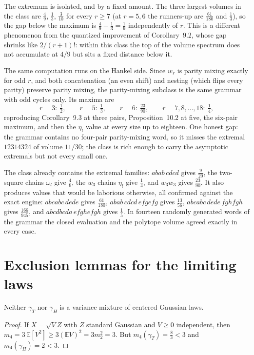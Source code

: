The extremum is isolated, and by a fixed amount.  The three largest
volumes in the class are $\tfrac49$, $\tfrac13$, $\tfrac3{10}$ for every
$r\ge7$ (at $r=5,6$ the runners-up are $\tfrac{61}{180}$ and
$\tfrac13$), so the gap below the maximum is $\tfrac49-\tfrac13=\tfrac19$
independently of $r$.  This is a different phenomenon from the quantized
improvement of Corollary~9.2, whose gap shrinks like $2/(r+1)!$: within
this class the top of the volume spectrum does not accumulate at $4/9$
but sits a fixed distance below it.

The same computation runs on the Hankel side.  Since $w_r$ is parity
mixing exactly for odd $r$, and both concatenation (an even shift) and
nesting (which flips every parity) preserve parity mixing, the
parity-mixing subclass is the same grammar with odd cycles only.  Its
maxima are
\[
r=3:\ \tfrac12,\qquad r=5:\ \tfrac13,\qquad r=6:\ \tfrac{23}{90},\qquad
r=7,8,\dots,18:\ \tfrac14 ,
\]
reproducing Corollary~9.3 at three pairs, Proposition~10.2 at five, the
six-pair maximum, and then the $\eta_l$ value at every size up to
eighteen.  One honest gap: the grammar contains no four-pair
parity-mixing word, so it misses the extremal $12314324$ of volume
$11/30$; the class is rich enough to carry the asymptotic extremals but
not every small one.

The class already contains the extremal families: $abab\,cdcd$ gives
$\tfrac9{20}$, the two-square chains $\omega_l$ give $\tfrac49$, the
$w_3$ chains $\eta_l$ give $\tfrac14$, and $w_3w_3$ gives
$\tfrac{23}{90}$.  It also produces values that would be laborious
otherwise, all confirmed against the exact engine: $abcabc\,dede$ gives
$\tfrac{61}{180}$, $abab\,cdcd\,efgefg$ gives $\tfrac{13}{56}$,
$abcabc\,dede\,fghfgh$ gives $\tfrac{166}{945}$, and
$abcdbcda\,efghefgh$ gives $\tfrac15$.  In fourteen randomly generated
words of the grammar the closed evaluation and the polytope volume agreed
exactly in every case.

\section{Exclusion lemmas for the limiting laws}

\begin{lemma}\label{lem:notgauss}
Neither $\gamma_T$ nor $\gamma_H$ is a variance mixture of centered
Gaussian laws.
\end{lemma}

\begin{proof}
If $X=\sqrt V Z$ with $Z$ standard Gaussian and $V\ge0$ independent, then
$m_4=3\,\mathbb E[V^2]\ge3(\mathbb E V)^2=3m_2^2=3$.  But
$m_4(\gamma_T)=\tfrac83<3$ and $m_4(\gamma_H)=2<3$.
\end{proof}

